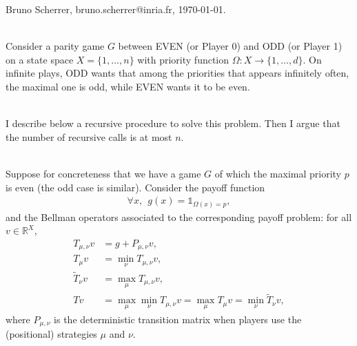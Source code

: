 \documentclass{article}
\def\1{{\mathds 1}}
\def\R{\mathbb R}
\begin{document}
\noindent Bruno Scherrer, bruno.scherrer@inria.fr, \today.

~\\

Consider a parity game $G$ between EVEN (or Player 0) and ODD (or Player 1) on a state space $X=\{1,\dots,n\}$ with priority function $\Omega:X \to \{1,\dots,d\}$. On infinite plays, ODD wants that among the priorities that appears infinitely often, the maximal one is odd, while EVEN wants it to be even.

~ \\

I describe below a recursive procedure to solve this problem. Then I argue that the number of recursive calls is at most $n$.

~\\

Suppose for concreteness that we have a game $G$ of which the maximal priority $p$ is even (the odd case is similar).
Consider the payoff function
\begin{align}
  \forall x,~~ g(x) = \1_{\Omega(x)=p},
\end{align}
and the Bellman operators associated to the corresponding payoff problem: for all $v \in \R^X$,
\begin{align}
  T_{\mu,\nu} v &= g + P_{\mu,\nu}v, \\
  T_{\mu} v & = \min_\nu T_{\mu,\nu} v, \\
  \tilde T_{\nu} v & = \max_\mu T_{\mu,\nu} v, \\
   T v &= \max_\mu \min_\nu T_{\mu,\nu}v = \max_\mu T_\mu v = \min_\nu \tilde T_\nu v,
\end{align}
where $P_{\mu,\nu}$ is the deterministic transition matrix when players use the (positional) strategies $\mu$ and $\nu$.
\end{document}
